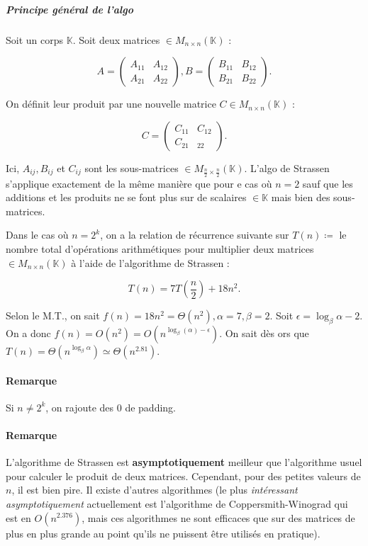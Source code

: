 \documentclass{article}
\begin{document}
			\subparagraph{Principe général de l'algo} Soit un corps $\mathbb K$. Soit deux matrices $\in M_{n \times n}(\mathbb K)$ :

			\[A = \begin{pmatrix}A_{11} & A_{12} \\ A_{21} & A_{22}\end{pmatrix}, B = \begin{pmatrix}B_{11} & B_{12} \\ B_{21} & B_{22}\end{pmatrix}.\]

			On définit leur produit par une nouvelle matrice $C \in M_{n \times n}(\mathbb K)$ :

			\[C = \begin{pmatrix}C_{11} & C_{12} \\ C_{21} & _{22}\end{pmatrix}.\]

			Ici, $A_{ij}, B_{ij}$ et $C_{ij}$ sont les sous-matrices $\in M_{\frac n2 \times \frac n2}(\mathbb K)$. L'algo de Strassen s'applique exactement de la même manière que pour e cas où $n=2$
			sauf que les additions et les produits ne se font plus sur de scalaires $\in \mathbb K$ mais bien des sous-matrices.

			Dans le cas où $n=2^k$, on a la relation de récurrence suivante sur $T(n) \coloneqq $ le nombre total d'opérations arithmétiques pour multiplier deux matrices $\in M_{n \times n}(\mathbb K)$
			à l'aide de l'algorithme de Strassen :

			\[T(n) = 7T\left(\frac n2\right) + 18n^2.\]

			Selon le M.T., on sait $f(n) = 18n^2 = \Theta(n^2), \alpha = 7, \beta = 2$. Soit $\epsilon = \log_\beta\alpha-2$. On a donc $f(n) = O(n^2) = O\left(n^{\log_\beta(\alpha) - \epsilon}\right)$.
			On sait dès ors que $T(n) = \Theta\left(n^{\log_\beta\alpha}\right) \simeq \Theta(n^{2.81})$.

			\paragraph{Remarque} Si $n \neq 2^k$, on rajoute des 0 de padding.

			\paragraph{Remarque} L'algorithme de Strassen est \textbf{asymptotiquement} meilleur que l'algorithme usuel pour calculer le produit de deux matrices. Cependant, pour des petites valeurs
			de $n$, il est bien pire. Il existe d'autres algorithmes (le plus \textit{intéressant asymptotiquement} actuellement est l'algorithme de Coppersmith-Winograd qui est en
			$O(n^{2.376})$, mais ces algorithmes ne sont efficaces que sur des matrices de plus en plus grande au point qu'ils ne puissent être utilisés en pratique).
\end{document}
